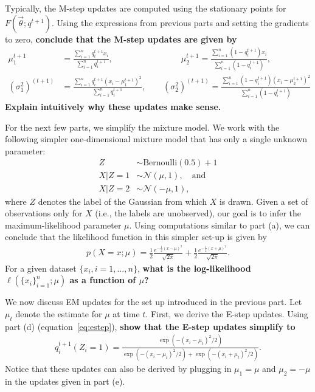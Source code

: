 \documentclass[preview]{standalone}
\begin{document}
\begin{Parts}
\Part Typically, the M-step updates are computed using the stationary points for $F(\vec\theta; q^{t+1})$. Using the
expressions from previous parts and setting the gradients to zero, {\bf conclude that the M-step updates are given by
\begin{align*}
  \mu_1^{t+1} &= \frac{\sum_{i=1}^n q_i^{t+1} x_i}{\sum_{i=1}^n q_i^{t+1}},\quad\quad\quad\quad\quad\quad\quad\quad
  \mu_2^{t+1} = \frac{\sum_{i=1}^n (1-q_i^{t+1}) x_i}{\sum_{i=1}^n (1-q_i^{t+1})},\\
  (\sigma_1^2)^{(t+1)} &= \frac{\sum_{i=1}^n q_i^{t+1} (x_i-\mu^{t+1}_1)^2}{\sum_{i=1}^n q_i^{t+1}},\quad\quad
  (\sigma_2^2)^{(t+1)} = \frac{\sum_{i=1}^n (1-q_i^{t+1}) (x_i-\mu^{t+1}_2)^2}{\sum_{i=1}^n (1-q_i^{t+1})}
\end{align*}
Explain intuitively why these updates make sense.}



\Part For the next few parts, we simplify the mixture model.
We work with the following simpler one-dimensional mixture model that
has only a single unknown parameter:
\begin{align*}
  Z &\sim \text{Bernoulli}(0.5) + 1\\
  X\vert Z=1 &\sim \mathcal{N}(\mu, 1), \quad \text{and}\\
  X\vert Z=2 &\sim \mathcal{N}(-\mu, 1),
\end{align*}
where $Z$ denotes the label of the Gaussian from which $X$ is drawn.
Given a set of observations only for $X$ (i.e., the labels are unobserved), 
our goal is to infer the maximum-likelihood parameter $\mu$.
Using computations similar to part (a), we can conclude that
the likelihood function in this simpler set-up is given by
\begin{align*}
  p(X=x; \mu) = \frac{1}{2} \frac{e^{-\frac{1}{2}(x-\mu)^2}}{\sqrt{2\pi}} + 
                \frac{1}{2} \frac{e^{-\frac{1}{2}(x+\mu)^2}}{\sqrt{2\pi}}.
\end{align*}
For a given dataset $\{x_i, i=1, \ldots, n\}$, 
{\bf what is the log-likelihood $\ell(\{x_i\}_{i=1}^n; \mu)$ as a function of $\mu$?}

\Part We now discuss EM updates for the set up introduced in the previous part.
Let $\mu_t$ denote the estimate for $\mu$ at time $t$.
First, we derive the E-step updates.
Using part (d) (equation~\eqref{eq:estep}), {\bf show that the E-step
  updates simplify to}
\begin{align*}
  q_i^{t+1}(Z_i=1) = \frac{\exp(-(x_i-\mu_t)^2/2)}{\exp(-(x_i-\mu_t)^2/2)+\exp(-(x_i+\mu_t)^2/2)}.
\end{align*}
Notice that these updates can also be derived by plugging in $\mu_1 = \mu$ and $\mu_2 = -\mu$ in the
updates given in part (e).


\end{Parts}
\end{document}
